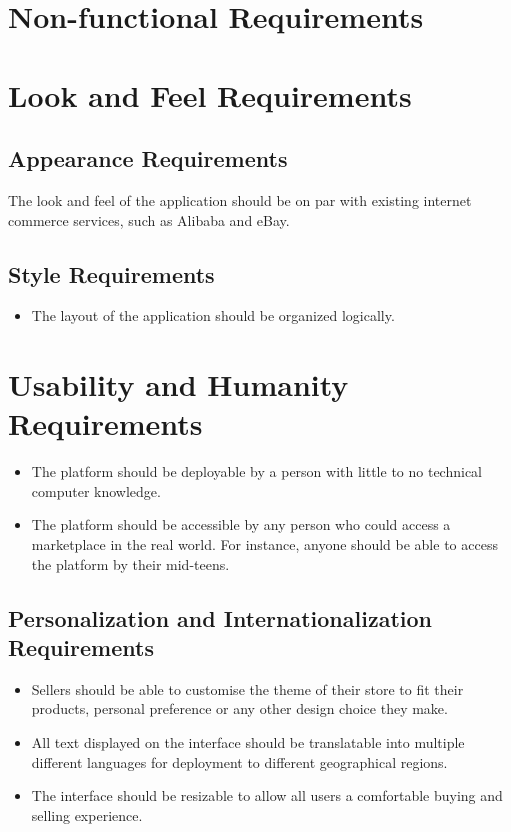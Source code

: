 \documentclass{article}
\begin{document}
\section*{Non-functional Requirements}

\section{Look and Feel Requirements}
\subsection{Appearance Requirements}
The look and feel of the application should be on par with existing internet commerce services, such as Alibaba and eBay. 

\subsection{Style Requirements}
\begin{itemize}
\item
The layout of the application should be organized logically.
\end{itemize}

\section{Usability and Humanity Requirements}
\begin{itemize}
\item
The platform should be deployable by a person with little to no technical computer knowledge.

\item
The platform should be accessible by any person who could access a marketplace in the real world. For instance, anyone should be able to access the platform by their mid-teens.
\end{itemize}

\subsection{Personalization and Internationalization Requirements}
\begin{itemize}
\item
Sellers should be able to customise the theme of their store to fit their products, personal preference or any other design choice they make. 

\item
All text displayed on the interface should be translatable into multiple different languages for deployment to different geographical regions.

\item
The interface should be resizable to allow all users a comfortable buying and selling experience.
\end{itemize}
\end{document}
